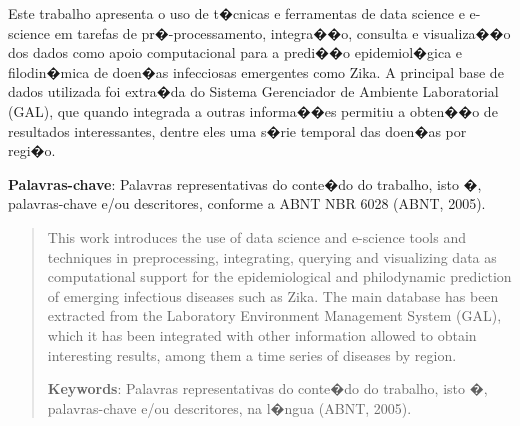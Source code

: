 \begin{resumo}

Este trabalho apresenta o uso de t�cnicas e ferramentas de data science e e-science em tarefas de pr�-processamento, integra��o, consulta e visualiza��o dos dados como apoio computacional para a predi��o epidemiol�gica e filodin�mica de doen�as infecciosas emergentes como Zika. A principal base de dados utilizada foi extra�da do Sistema Gerenciador de Ambiente Laboratorial (GAL), que quando integrada a outras informa��es permitiu a obten��o de resultados interessantes, dentre eles uma s�rie temporal das doen�as por regi�o.

{\hspace{-8mm} \bf{Palavras-chave}}: Palavras representativas do conte�do do trabalho, isto �, palavras-chave e/ou descritores, conforme a ABNT NBR 6028 (ABNT, 2005).

\end{resumo}

\begin{abstract}

This work introduces the use of data science and e-science tools and techniques in preprocessing, integrating, querying and visualizing data as computational support for the epidemiological and philodynamic prediction of emerging infectious diseases such as Zika. The main database has been extracted from the Laboratory Environment Management System (GAL), which it has been integrated with other information allowed to obtain interesting results, among them a time series of diseases by region.

{\hspace{-8mm} \bf{Keywords}}: Palavras representativas do conte�do do trabalho, isto �, palavras-chave e/ou descritores, na l�ngua (ABNT, 2005).

\end{abstract}

\listoffigures


\cleardoublepage
\listoftables
\cleardoublepage

